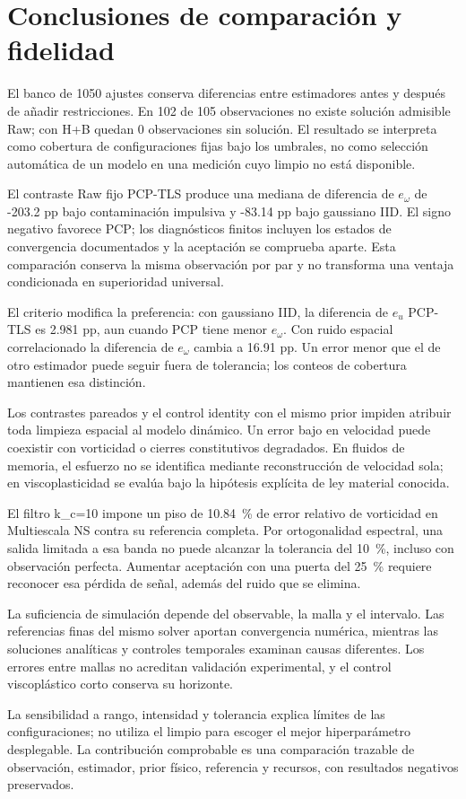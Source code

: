 \section{Conclusiones de comparación y fidelidad}
El banco de 1050 ajustes conserva diferencias entre estimadores antes y después de añadir restricciones. En 102 de 105 observaciones no existe solución admisible Raw; con H+B quedan 0 observaciones sin solución. El resultado se interpreta como cobertura de configuraciones fijas bajo los umbrales, no como selección automática de un modelo en una medición cuyo limpio no está disponible.

El contraste Raw fijo PCP-TLS produce una mediana de diferencia de $e_\omega$ de -203.2 pp bajo contaminación impulsiva y -83.14 pp bajo gaussiano IID. El signo negativo favorece PCP; los diagnósticos finitos incluyen los estados de convergencia documentados y la aceptación se comprueba aparte. Esta comparación conserva la misma observación por par y no transforma una ventaja condicionada en superioridad universal.

El criterio modifica la preferencia: con gaussiano IID, la diferencia de $e_u$ PCP-TLS es 2.981 pp, aun cuando PCP tiene menor $e_\omega$. Con ruido espacial correlacionado la diferencia de $e_\omega$ cambia a 16.91 pp. Un error menor que el de otro estimador puede seguir fuera de tolerancia; los conteos de cobertura mantienen esa distinción.

Los contrastes pareados y el control identity con el mismo prior impiden atribuir toda limpieza espacial al modelo dinámico. Un error bajo en velocidad puede coexistir con vorticidad o cierres constitutivos degradados. En fluidos de memoria, el esfuerzo no se identifica mediante reconstrucción de velocidad sola; en viscoplasticidad se evalúa bajo la hipótesis explícita de ley material conocida.

El filtro k\_c=10 impone un piso de 10.84~\% de error relativo de vorticidad en Multiescala NS contra su referencia completa. Por ortogonalidad espectral, una salida limitada a esa banda no puede alcanzar la tolerancia del 10~\%, incluso con observación perfecta. Aumentar aceptación con una puerta del 25~\% requiere reconocer esa pérdida de señal, además del ruido que se elimina.

La suficiencia de simulación depende del observable, la malla y el intervalo. Las referencias finas del mismo solver aportan convergencia numérica, mientras las soluciones analíticas y controles temporales examinan causas diferentes. Los errores entre mallas no acreditan validación experimental, y el control viscoplástico corto conserva su horizonte.

La sensibilidad a rango, intensidad y tolerancia explica límites de las configuraciones; no utiliza el limpio para escoger el mejor hiperparámetro desplegable. La contribución comprobable es una comparación trazable de observación, estimador, prior físico, referencia y recursos, con resultados negativos preservados.
